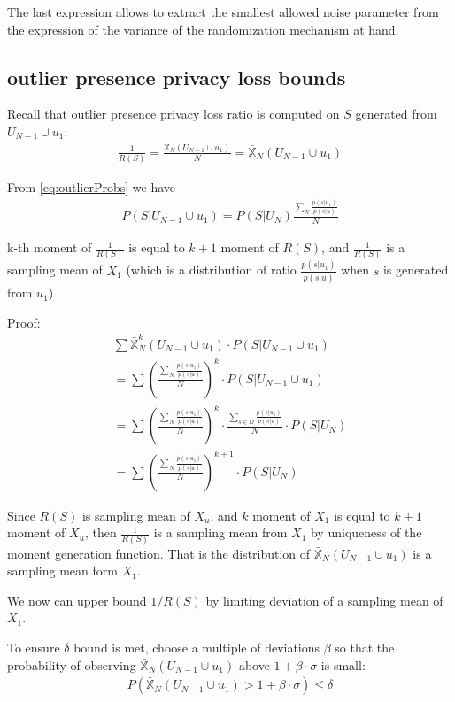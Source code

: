 \documentclass[11pt]{article}
\begin{document}
The last expression allows to extract the smallest allowed noise parameter from the expression of the variance of the randomization mechanism at hand. 

 \subsection{outlier presence privacy loss bounds}

Recall that outlier presence privacy loss ratio is computed on $S$ generated from $U_{N-1} \cup u_1$:
\begin{align}
\frac{1}{R(S)} =  \frac{\mathbb{X}_N(U_{N-1} \cup u_1)}{N} = \bar{\mathbb{X}}_N(U_{N-1} \cup u_1)
\end{align}

From \eqref{eq:outlierProbs}  we have 
\begin{align}
P(S|U_{N-1} \cup u_1) =  P(S|U_N)  \frac{\sum_N  \frac{ p(s | u_1)} { p(s | u) }}{N} 
\end{align}

\begin{lem}
k-th moment of $\frac{1}{R(S)}$ is equal to $k+1$ moment of $R(S)$, and $\frac{1}{R(S)}$ is a sampling mean of $X_1$ (which is a distribution of  ratio $\frac{ p(s | u_1)} { p(s | u) }$ when $s$ is generated from $u_1$)
\end{lem}
Proof:
\begin{align}
\sum  \bar{\mathbb{X}}_N^k(U_{N-1} \cup u_1) \cdot P(S|U_{N-1} \cup u_1) \\
= \sum \left ( \frac{\sum_N  \frac{ p(s | u_1)} { p(s | u) }}{N}  \right )^k  \cdot P(S|U_{N-1} \cup u_1) \\
=  \sum \left ( \frac{\sum_N  \frac{ p(s | u_1)} { p(s | u) }}{N}  \right )^k \cdot  \frac{\sum_{s \in \Omega}  \frac{ p(s | u_1)} { p(s | u) }}{N}  \cdot P(S|U_N) \\
= \sum \left ( \frac{\sum_N  \frac{ p(s | u_1)} { p(s | u) }}{N}  \right )^{k+1} \cdot P(S|U_N)
\end{align}

Since $R(S)$ is sampling mean of $X_u$, and $k$ moment of $X_1$ is equal to $k+1$ moment of $X_u$, then  $\frac{1}{R(S)}$ is a sampling mean from $X_1$ by uniqueness of the moment generation function. That is the distribution of $\bar{\mathbb{X}}_N(U_{N-1} \cup u_1)$ is a sampling mean form $X_1$.  

We now can upper bound $1/R(S)$ by limiting deviation of a sampling mean of $X_1$.

To ensure $\delta$ bound is met,  choose a multiple of deviations $\beta$ so that  the probability of observing $\bar{\mathbb{X}}_N(U_{N-1} \cup u_1)$ above $1+  \beta \cdot \sigma$ is small:
\begin{align}
P (\bar{\mathbb{X}}_N(U_{N-1} \cup u_1) > 1 + \beta \cdot \sigma) \le \delta
\end{align}
\end{document}

